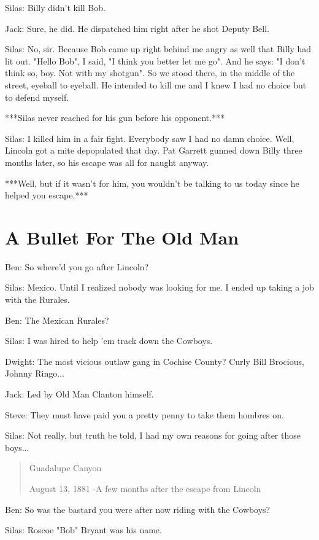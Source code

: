 \documentclass{article}
\begin{document}
Silas: Billy didn't kill Bob.

Jack: Sure, he did. He dispatched him right after he shot Deputy Bell.

Silas: No, sir. Because Bob came up right behind me angry as well that Billy had lit out. "Hello Bob", I said, "I think you better let me go". And he says: "I don't think so, boy. Not with my shotgun". So we stood there, in the middle of the street, eyeball to eyeball. He intended to kill me and I knew I had no choice but to defend myself.

***Silas never reached for his gun before his opponent.***

Silas: I killed him in a fair fight. Everybody saw I had no damn choice. Well, Lincoln got a mite depopulated that day. Pat Garrett gunned down Billy three months later, so his escape was all for naught anyway.

***Well, but if it wasn't for him, you wouldn't be talking to us today since he helped you escape.***

\section*{A Bullet For The Old Man}

Ben: So where'd you go after Lincoln?

Silas: Mexico. Until I realized nobody was looking for me. I ended up taking a job with the Rurales.

Ben: The Mexican Rurales?

Silas: I was hired to help 'em track down the Cowboys.

Dwight: The most vicious outlaw gang in Cochise County? Curly Bill Brocious, Johnny Ringo...

Jack: Led by Old Man Clanton himself.

Steve: They must have paid you a pretty penny to take them hombres on.

Silas: Not really, but truth be told, I had my own reasons for going after those boys...

\begin{quote}
    Guadalupe Canyon
    
    August 13, 1881 -A few months after the escape from Lincoln
\end{quote}

Ben: So was the bastard you were after now riding with the Cowboys?

Silas: Roscoe "Bob" Bryant was his name.
\end{document}
